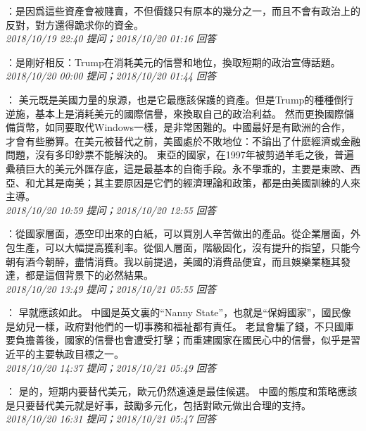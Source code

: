 \documentclass[twocolumn]{ctexart}
\begin{document}
：是因爲這些資產會被賤賣，不但價錢只有原本的幾分之一，而且不會有政治上的反對，對方還得跪求你的資金。
\\

\textit{\hfill\noindent\small 2018/10/19 22:40 提问；2018/10/20 01:16 回答}

：是剛好相反：Trump在消耗美元的信譽和地位，換取短期的政治宣傳話題。
\\

\textit{\hfill\noindent\small 2018/10/20 00:00 提问；2018/10/20 01:44 回答}

：
美元既是美國力量的泉源，也是它最應該保護的資產。但是Trump的種種倒行逆施，基本上是消耗美元的國際信譽，來換取自己的政治利益。
然而更換國際儲備貨幣，如同要取代Windows一樣，是非常困難的。中國最好是有歐洲的合作，才會有些勝算。在美元被替代之前，美國處於不敗地位：不論出了什麽經濟或金融問題，沒有多印鈔票不能解決的。
東亞的國家，在1997年被剪過羊毛之後，普遍纍積巨大的美元外匯存底，這是最基本的自衛手段。永不學乖的，主要是東歐、西亞、和尤其是南美；其主要原因是它們的經濟理論和政策，都是由美國訓練的人來主導。
\\

\textit{\hfill\noindent\small 2018/10/20 10:59 提问；2018/10/20 12:55 回答}

：從國家層面，憑空印出來的白紙，可以買別人辛苦做出的產品。從企業層面，外包生產，可以大幅提高獲利率。從個人層面，階級固化，沒有提升的指望，只能今朝有酒今朝醉，盡情消費。我以前提過，美國的消費品便宜，而且娛樂業極其發達，都是這個背景下的必然結果。
\\

\textit{\hfill\noindent\small 2018/10/20 13:49 提问；2018/10/21 05:55 回答}

：
早就應該如此。
中國是英文裏的“Nanny State”，也就是“保姆國家”，國民像是幼兒一樣，政府對他們的一切事務和福祉都有責任。
老鼠會騙了錢，不只國庫要負擔善後，國家的信譽也會遭受打擊；而重建國家在國民心中的信譽，似乎是習近平的主要執政目標之一。
\\

\textit{\hfill\noindent\small 2018/10/20 14:37 提问；2018/10/21 05:49 回答}

：
是的，短期内要替代美元，歐元仍然遠遠是最佳候選。
中國的態度和策略應該是只要替代美元就是好事，鼓勵多元化，包括對歐元做出合理的支持。
\\

\textit{\hfill\noindent\small 2018/10/20 16:31 提问；2018/10/21 05:47 回答}
\end{document}
